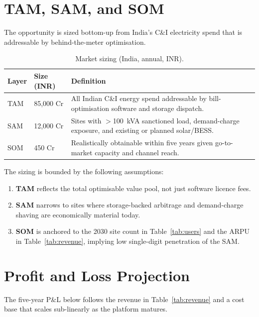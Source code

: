 \documentclass[journal,article,submit,moreauthors]{Definitions/mdpi}
\begin{document}
\section{TAM, SAM, and SOM}\label{sec:tamsamsom}

The opportunity is sized bottom-up from India's C\&I electricity spend that is
addressable by behind-the-meter optimisation.

\begin{table}[H]
	\caption{Market sizing (India, annual, INR).}
	\label{tab:tamsamsom}
	\begin{tabularx}{\textwidth}{llX}
		\toprule
		\textbf{Layer} & \textbf{Size (INR)} & \textbf{Definition} \\
		\midrule
		TAM & 85{,}000 Cr & All Indian C\&I energy spend addressable by
		bill-optimisation software and storage dispatch. \\
		SAM & 12{,}000 Cr & Sites with $>$100~kVA sanctioned load, demand-charge
		exposure, and existing or planned solar/BESS. \\
		SOM & 450 Cr & Realistically obtainable within five years given
		go-to-market capacity and channel reach. \\
		\bottomrule
	\end{tabularx}
\end{table}

The sizing is bounded by the following assumptions:

\begin{enumerate}
	\item \textbf{TAM} reflects the total optimisable value pool, not just
	      software licence fees.
	\item \textbf{SAM} narrows to sites where storage-backed arbitrage and
	      demand-charge shaving are economically material today.
	\item \textbf{SOM} is anchored to the 2030 site count in
	      Table~\ref{tab:users} and the ARPU in Table~\ref{tab:revenue},
	      implying low single-digit penetration of the SAM.
\end{enumerate}

\section{Profit and Loss Projection}\label{sec:pnl}

The five-year P\&L below follows the revenue in Table~\ref{tab:revenue} and a
cost base that scales sub-linearly as the platform matures.
\end{document}
